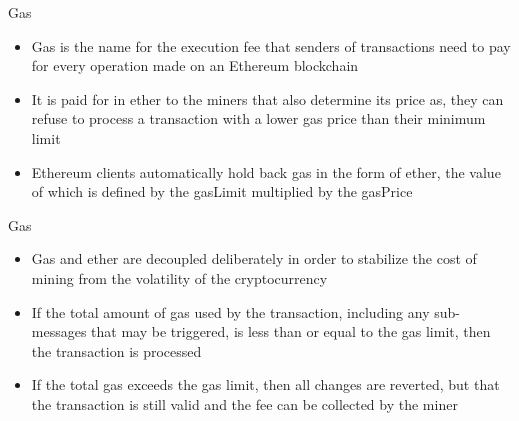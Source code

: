\documentclass[10pt]{beamer}
\begin{document}


\begin{frame}{Gas}
	\begin{itemize}
		\item Gas is the name for the execution fee that senders of transactions need to pay for every operation made on an Ethereum blockchain
		\item It is paid for in ether to the miners that also determine its price as, they can refuse to process a transaction with a lower gas price than their minimum limit
		\item Ethereum clients automatically hold back gas in the form of ether, the value of which is defined by the gasLimit multiplied by the gasPrice
	\end{itemize}
\end{frame}


\begin{frame}{Gas}
	\begin{itemize}
		\item Gas and ether are decoupled deliberately in order to stabilize the cost of mining from the volatility of the cryptocurrency
		\item If the total amount of gas used by the transaction, including any sub-messages that may be triggered, is less than or equal to the gas limit, then the transaction is processed
		\item If the total gas exceeds the gas limit, then all changes are reverted, but that the transaction is still valid and the fee can be collected by the miner
	\end{itemize}
\end{frame}

\end{document}
